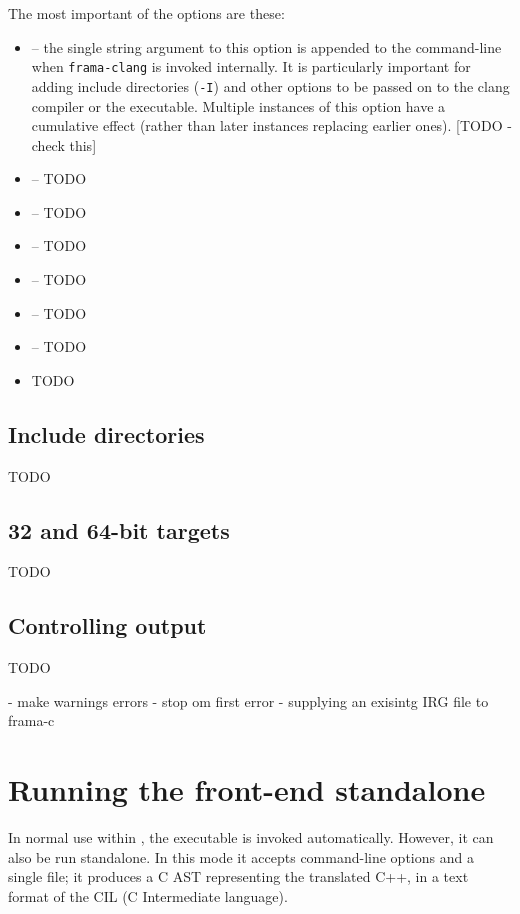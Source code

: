 The most important of the options are these:
\begin{itemize}
	\item {} -- the single string argument to this option is appended to the command-line when 
	\lstinline|frama-clang| is invoked internally. It is particularly 
	important for adding include directories (\lstinline|-I|) and
	other options to be passed on to the clang compiler or the \irg executable. 
	Multiple instances of this option have a cumulative effect (rather
	than later instances replacing earlier ones). [TODO - check this]
	\item {} -- TODO
	\item {} -- TODO
	\item {} -- TODO
	\item {} -- TODO
	\item {} -- TODO
	\item {} -- TODO
		\item TODO
\end{itemize}

\section{Include directories}

TODO

\section{32 and 64-bit targets}

TODO


\section{Controlling output}

TODO

- make warnings errors
- stop om first error
- supplying an exisintg IRG file to frama-c

\chapter{Running the \fclang front-end standalone}
\label{sec:standalone}

In normal use within \framac, the \irg executable is
invoked automatically. However, it can also be run standalone.
In this mode it accepts command-line options and a single file;
it produces a C AST representing the translated C++, in a text format 
of the CIL (C Intermediate language).

